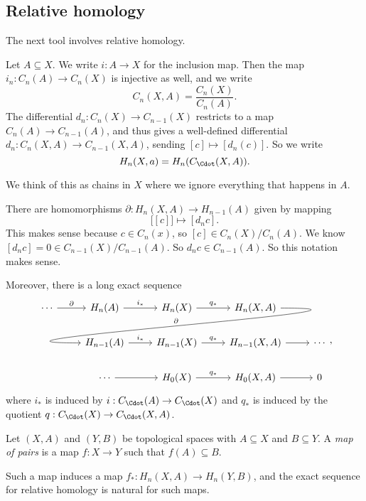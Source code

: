 \documentclass[a4paper]{article}
\begin{document}
\subsection{Relative homology}
The next tool involves relative homology.
\begin{defi}
  Let $A \subseteq X$. We write $i: A \to X$ for the inclusion map. Then the map $i_n: C_n(A) \to C_n(X)$ is injective as well, and we write
  \[
    C_n(X, A) = \frac{C_n(X)}{C_n(A)}.
  \]
  The differential $d_n: C_n(X) \to C_{n - 1}(X)$ restricts to a map $C_n(A) \to C_{n - 1}(A)$, and thus gives a well-defined differential $d_n: C_n(X, A) \to C_{n - 1}(X, A)$, sending $[c] \mapsto [d_n(c)]$. So we write
  \[
    H_n(X, a) = H_n(C_{\Cdot}(X, A)).
  \]
\end{defi}
We think of this as chains in $X$ where we ignore everything that happens in $A$.

\begin{thm}
  There are homomorphisms $\partial: H_n(X, A) \to H_{n - 1}(A)$ given by mapping
  \[
    \big[[c]\big] \mapsto [d_n c].
  \]
  This makes sense because $c \in C_n(x)$, so $[c] \in C_n(X)/C_n(A)$. We know $[d_n c] = 0 \in C_{n - 1}(X)/C_{n - 1}(A)$. So $d_n c \in C_{n - 1}(A)$. So this notation makes sense.

  Moreover, there is a long exact sequence
  \[
    \begin{tikzcd}
      \cdots \ar[r, "\partial"] & H_n(A) \ar[r, "i_*"] & H_n(X) \ar[r, "q_*"] & H_n(X, A)\ar[out=0, in=180, looseness=2, overlay, lld, "\partial"']\\
      & H_{n - 1}(A) \ar[r, "i_*"] & H_{n - 1}(X) \ar[r, "q_*"] & H_{n - 1}(X, A) \ar [r] & \cdots\\
      &\cdots \ar[r] & H_0(X) \ar[r, "q_*"] & H_0(X, A) \ar [r] & 0
    \end{tikzcd},
  \]
  where $i_*$ is induced by $i: C_{\Cdot}(A) \to C_{\Cdot}(X)$ and $q_*$ is induced by the quotient $q: C_{\Cdot}(X) \to C_{\Cdot}(X, A)$.
\end{thm}

\begin{defi}
  Let $(X, A)$ and $(Y, B)$ be topological spaces with $A \subseteq X$ and $B \subseteq Y$. A \emph{map of pairs} is a map $f: X \to Y$ such that $f(A) \subseteq B$.
\end{defi}

Such a map induces a map $f_*: H_n(X, A) \to H_n(Y, B)$, and the exact sequence for relative homology is natural for such maps.
\end{document}
